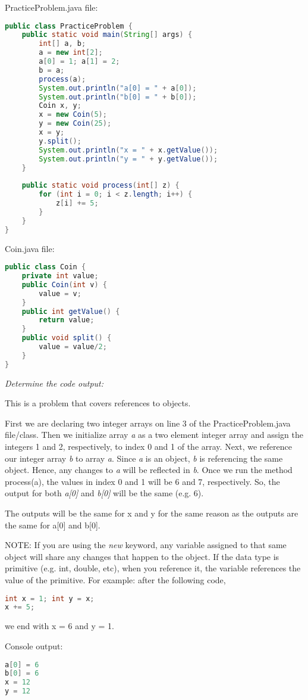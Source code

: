 \documentclass[9pt]{article}
\begin{document}
\begin{multicols}{2}
PracticeProblem.java file:
\begin{lstlisting}[language=Java]
public class PracticeProblem {
	public static void main(String[] args) {
		int[] a, b;
		a = new int[2];
		a[0] = 1; a[1] = 2;
		b = a;
		process(a);
		System.out.println("a[0] = " + a[0]);
		System.out.println("b[0] = " + b[0]);
		Coin x, y;
		x = new Coin(5);
		y = new Coin(25);
		x = y;
		y.split();
		System.out.println("x = " + x.getValue());
		System.out.println("y = " + y.getValue());
	}
	
	public static void process(int[] z) {
		for (int i = 0; i < z.length; i++) {
			z[i] += 5;
		}
	}
}
\end{lstlisting}
\vspace{5mm}
Coin.java file:
\begin{lstlisting}[language=Java]
public class Coin {
	private int value;
	public Coin(int v) {
		value = v;
	}
	public int getValue() {
		return value;
	}
	public void split() {
		value = value/2;
	}
}
\end{lstlisting}
\vfill
\columnbreak
\textit{Determine the code output:}

This is a problem that covers references to objects.

First we are declaring two integer arrays on line 3 of the PracticeProblem.java file/class. Then we initialize array \emph{a} as a two element integer array and assign the integers 1 and 2, respectively, to index 0 and 1 of the array. Next, we reference our integer array \emph{b} to array \emph{a}.  Since \emph{a} is an object, \emph{b} is referencing the same object.  Hence, any changes to \emph{a} will be reflected in \emph{b}.  Once we run the method process(a), the values in index 0 and 1 will be 6 and 7, respectively.  So, the output for both \emph{a[0]} and \emph{b[0]} will be the same (e.g. 6).

The outputs will be the same for x and y for the same reason as the outputs are the same for a[0] and b[0].

NOTE: If you are using the \emph{new} keyword, any variable assigned to that same object will share any changes that happen to the object.  If the data type is primitive (e.g. int, double, etc), when you reference it, the variable references the value of the primitive.   For example: after the following code,
\begin{lstlisting}[language=Java]
int x = 1; int y = x;
x += 5;
\end{lstlisting}
we end with x = 6 and y = 1.
\hfill\vspace{5mm}

Console output:

\begin{lstlisting}[language=Java]
a[0] = 6
b[0] = 6
x = 12
y = 12
\end{lstlisting}
\end{multicols}
\end{document}
